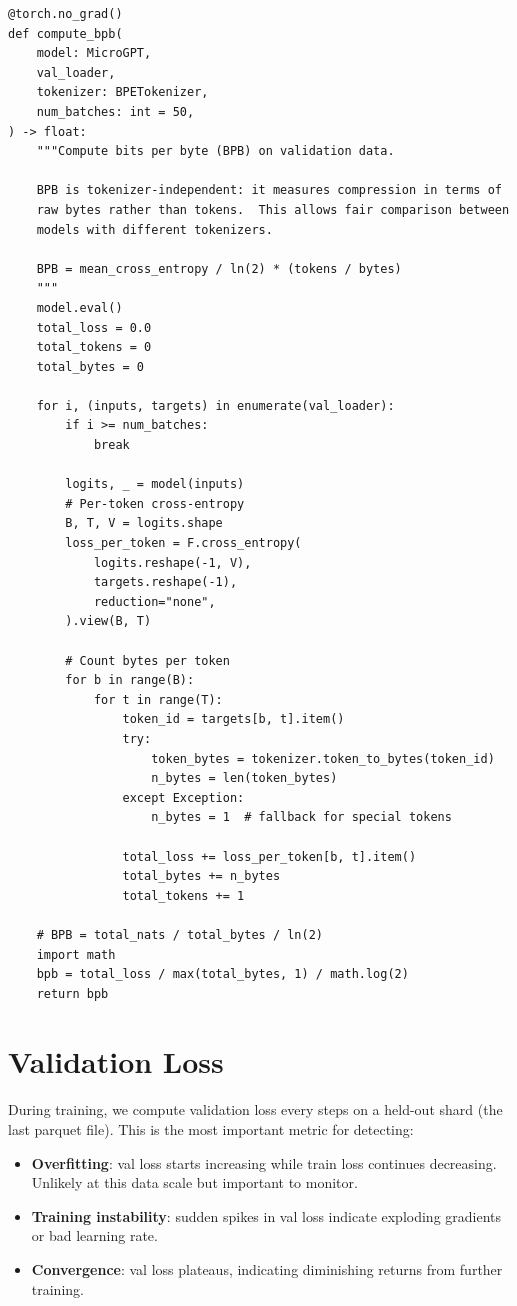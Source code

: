 \begin{lstlisting}
@torch.no_grad()
def compute_bpb(
    model: MicroGPT,
    val_loader,
    tokenizer: BPETokenizer,
    num_batches: int = 50,
) -> float:
    """Compute bits per byte (BPB) on validation data.

    BPB is tokenizer-independent: it measures compression in terms of
    raw bytes rather than tokens.  This allows fair comparison between
    models with different tokenizers.

    BPB = mean_cross_entropy / ln(2) * (tokens / bytes)
    """
    model.eval()
    total_loss = 0.0
    total_tokens = 0
    total_bytes = 0

    for i, (inputs, targets) in enumerate(val_loader):
        if i >= num_batches:
            break

        logits, _ = model(inputs)
        # Per-token cross-entropy
        B, T, V = logits.shape
        loss_per_token = F.cross_entropy(
            logits.reshape(-1, V),
            targets.reshape(-1),
            reduction="none",
        ).view(B, T)

        # Count bytes per token
        for b in range(B):
            for t in range(T):
                token_id = targets[b, t].item()
                try:
                    token_bytes = tokenizer.token_to_bytes(token_id)
                    n_bytes = len(token_bytes)
                except Exception:
                    n_bytes = 1  # fallback for special tokens

                total_loss += loss_per_token[b, t].item()
                total_bytes += n_bytes
                total_tokens += 1

    # BPB = total_nats / total_bytes / ln(2)
    import math
    bpb = total_loss / max(total_bytes, 1) / math.log(2)
    return bpb
\end{lstlisting}


\section{Validation Loss}

During training, we compute validation loss every  steps on a held-out shard (the last parquet file).  This is the most important metric for detecting:

\begin{itemize}
  \item \textbf{Overfitting}: val loss starts increasing while train loss continues decreasing.  Unlikely at this data scale but important to monitor.
  \item \textbf{Training instability}: sudden spikes in val loss indicate exploding gradients or bad learning rate.
  \item \textbf{Convergence}: val loss plateaus, indicating diminishing returns from further training.
\end{itemize}


